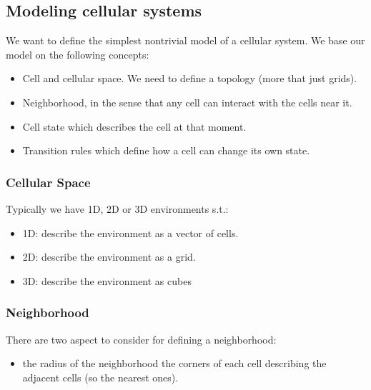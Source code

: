 \subsection{Modeling cellular systems}
We want to define the simplest nontrivial model of a cellular system. We base our model on the following concepts:
\begin{itemize}
    \item Cell and cellular space. We need to define a topology (more that just grids).
    \item Neighborhood, in the sense that any cell can interact with the cells near it.
    \item Cell state which describes the cell at that moment.
    \item Transition rules which define how a cell can change its own state.
\end{itemize}

\subsubsection{Cellular Space}
Typically we have 1D, 2D or 3D environments s.t.:
\begin{itemize}
    \item 1D: describe the environment as a vector of cells.
    \item 2D: describe the environment as a grid.
    \item 3D: describe the environment as cubes
\end{itemize}

\subsubsection{Neighborhood}
There are two aspect to consider for defining a neighborhood:
\begin{itemize}
    \item the radius of the neighborhood
    \items the corners of each cell describing the adjacent cells (so the nearest ones).
\end{itemize}

